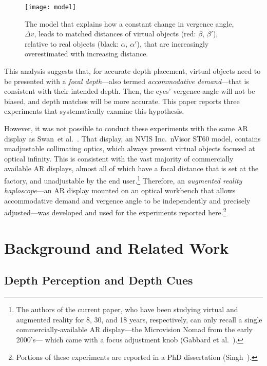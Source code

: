 \documentclass[10pt,journal,compsoc]{IEEEtran}
\makeatletter
\newlength{\FigWidth}
\newcommand{\etal}{et al.\@\xspace} %
\makeatother
\begin{document}
\begin{figure}[!t]
\centering
\texttt{[image: model]}
\caption{The model that explains how a constant change in vergence angle, $\Delta v$, leads to matched distances of virtual objects (red: $\beta$, $\beta'$), relative to real objects (black: $\alpha$, $\alpha'$), that are increasingly overestimated with increasing distance.}
\label{f:model}
\end{figure}



This analysis suggests that, for accurate depth placement, virtual objects need to be presented with a \emph{focal depth}---also termed \emph{accommodative demand}---that is consistent with their intended depth.  Then, the eyes' vergence angle will not be biased, and depth matches will be more accurate.  This paper reports three experiments that systematically examine this hypothesis.

However, it was not possible to conduct these experiments with the same AR display as Swan~\etal~\cite{swan:2015}.  That display, an NVIS Inc.\ nVisor ST60 model, contains unadjustable collimating optics, which always present virtual objects focused at optical infinity.  This is consistent with the vast majority of commercially available AR displays, almost all of which have a focal distance that is set at the factory, and unadjustable by the end user.\footnote{%
The authors of the current paper, who have been studying virtual and augmented reality for 8, 30, and 18 years, respectively, can only recall a single commercially-available AR display---the Microvision Nomad from the early 2000's--- which came with a focus adjustment knob (Gabbard \etal~\cite{gabbard:2017}).} %
Therefore, an \emph{augmented reality haploscope}---an AR display mounted on an optical workbench that allows accommodative demand and vergence angle to be independently and precisely adjusted---was developed and used for the experiments reported here.\footnote{%
Portions of these experiments are reported in a PhD dissertation (Singh~\cite{singh:2013}).
}%

\section {Background and Related Work}

\subsection{Depth Perception and Depth Cues}
\end{document}
